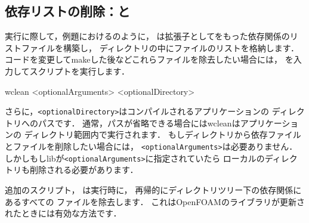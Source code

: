 \subsection{依存リストの削除：と}
\label{ssec:3.2.3}
実行に際して，例題におけるのように，
は拡張子としてをもった依存関係のリストファイルを構築し，
ディレクトリの中にファイルのリストを格納します．
コードを変更してmakeした後などこれらファイルを除去したい場合には，
%
%
を入力してスクリプトを実行します．
\begin{OFverbatim}[terminal]
wclean <optionalArguments> <optionalDirectory>
\end{OFverbatim}
さらに，\verb|<optionalDirectory>|はコンパイルされるアプリケーションの
ディレクトリへのパスです．
通常，パスが省略できる場合にはwcleanはアプリケーションの
ディレクトリ範囲内で実行されます．
もしディレクトリから依存ファイルとファイルを削除したい場合には，
\verb|<optionalArguments>|は必要ありません．
しかしもしlibが\verb|<optionalArguments>|に指定されていたら
ローカルのディレクトリも削除される必要があります．

追加のスクリプト，
%
%
は実行時に，
再帰的にディレクトリツリー下の依存関係にあるすべての
ファイルを除去します．
これはOpenFOAMのライブラリが更新されたときには有効な方法です．


